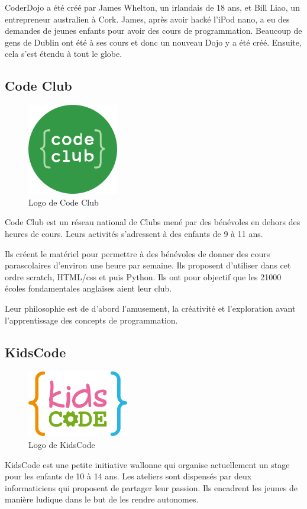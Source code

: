 CoderDojo a été créé par James Whelton, un irlandais de 18 ans, et Bill Liao, un entrepreneur australien à Cork. James, après avoir hacké l'iPod nano, a eu des demandes de jeunes enfants pour avoir des cours de programmation. Beaucoup de gens de Dublin ont été à ses cours et donc un nouveau Dojo y a été créé. Ensuite, cela s'est étendu à tout le globe.

\subsection{Code Club}
\begin{figure}[!h]
  \begin{center}
    \includegraphics[scale=0.3]{content/5-related_work/images/club}
    \caption{Logo de Code Club}
    \label{fig:code club}
  \end{center}
\end{figure}
Code Club\cite{codeclub-about} est un réseau national de Clubs mené par des bénévoles en dehors des heures de cours. Leurs activités s'adressent à des enfants de 9 à 11 ans.

Ils créent le matériel pour permettre à des bénévoles de donner des cours parascolaires d'environ une heure par semaine. Ils proposent d'utiliser dans cet ordre scratch, HTML/css et puis Python. Ils ont pour objectif que les 21000 écoles fondamentales anglaises aient leur club.

Leur philosophie est de d'abord l'amusement, la créativité et l'exploration avant l'apprentissage des concepts de programmation.

\subsection{KidsCode}
\label{init-kidscode}
\begin{figure}[!h]
  \begin{center}
    \includegraphics[scale=0.5]{content/5-related_work/images/kidscode}
    \caption{Logo de KidsCode}
    \label{fig:kidscode}
  \end{center}
\end{figure}
KidsCode \cite{kidscode} est une petite initiative wallonne qui organise actuellement un stage pour les enfants de 10 à 14 ans. Les ateliers sont dispensés par deux informaticiens qui proposent de partager leur passion. Ils encadrent les jeunes de manière ludique dans le but de les rendre autonomes.

